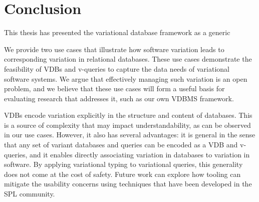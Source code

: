 \chapter{Conclusion}
\label{ch:conclusion}

This thesis has presented the variational database framework as a generic

We provide two use cases that illustrate how software variation leads to
corresponding variation in relational databases. These use cases demonstrate
the feasibility of VDBs and v-queries to capture the data needs of variational
software systems.
%
We argue that effectively managing such variation is an open problem, and we
believe that these use cases will form a useful basis for evaluating
research that addresses it, such as our own VDBMS framework.
%
%


VDBs encode variation explicitly in the structure and content of databases.
%
This is a source of complexity that may impact understandability, as can be
observed in our use cases. However, it also has several advantages: it
is general in the sense that any set of variant databases and queries can be
encoded as a VDB and v-queries, and it enables directly associating variation
in databases to variation in software.
%
By applying variational typing to variational queries, this generality does not
come at the cost of safety. Future work can explore how tooling can mitigate
the usability concerns using techniques that have been developed in the SPL
community.




